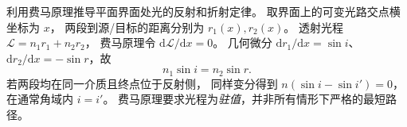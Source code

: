 利用费马原理推导平面界面处光的反射和折射定律。
\exsolution
取界面上的可变光路交点横坐标为 $x$，
两段到源/目标的距离分别为 $r_1(x),r_2(x)$。
透射光程
$\mathcal L=n_1r_1+n_2r_2$，
费马原理令
$\mathrm d\mathcal L/\mathrm dx=0$。
几何微分
$\mathrm dr_1/\mathrm dx=\sin i$、
$\mathrm dr_2/\mathrm dx=-\sin r$，故
\[
\boxed{n_1\sin i=n_2\sin r}.
\]
若两段均在同一介质且终点位于反射侧，
同样变分得到
$n(\sin i-\sin i')=0$，
在通常角域内
$\boxed{i=i'}$。
\excheck 费马原理要求光程为\emph{驻值}，并非所有情形下严格的最短路径。
